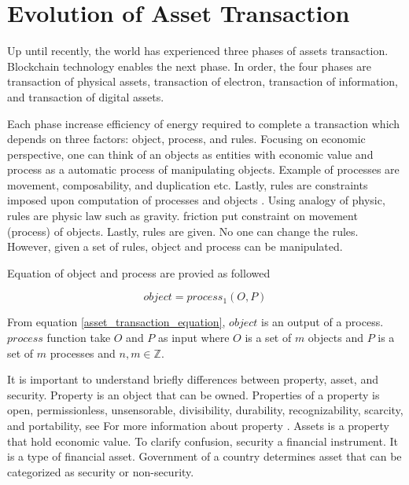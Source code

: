 \documentclass{IEEEtran}
\begin{document}
\section{Evolution of Asset Transaction}
\label{sec:org90cbe65}
Up until recently, the world has experienced three phases of assets transaction. Blockchain technology enables the next phase. In order, the four phases are transaction of physical assets, transaction of electron, transaction of information, and transaction of digital assets.

Each phase increase efficiency of energy required to complete a transaction which depends on three factors: object, process, and rules. Focusing on economic perspective, one can think of an objects as entities with economic value and process as a automatic process of manipulating objects. Example of processes are movement, composability, and duplication etc. Lastly, rules are constraints imposed upon computation of processes and objects \cite{tai2020nfting}. Using analogy of physic, rules are physic law such as gravity. friction put constraint on movement (process) of objects. Lastly, rules are given. No one can change the rules. However, given a set of rules, object and process can be manipulated.

Equation of object and process are provied as followed

\begin{equation}
\label{asset_transaction_equation}
object = process_1(O, P)
\end{equation}

From equation \ref{asset_transaction_equation}, \(object\) is an output of a process.  \(process\) function take \(O\) and \(P\) as input where \(O\) is a set of \(m\) objects and \(P\) is a set of \(m\) processes and \(n, m \in \mathbb{Z}\).

It is important to understand briefly differences between property, asset, and security. Property is an object that can be owned. Properties of a property is open, permissionless, unsensorable, divisibility, durability, recognizability, scarcity, and portability, see For more information about property \cite{saylor2021bitcoin,breedlove2021philosophy}. Assets is a property that hold economic value. To clarify confusion, security a financial instrument. It is a type of financial asset. Government of a country determines asset that can be categorized as security or non-security.
\end{document}
